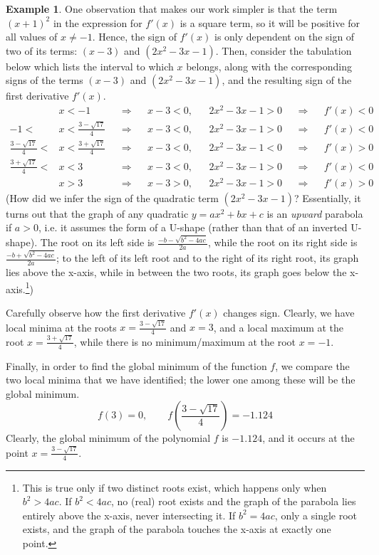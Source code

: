 \documentclass[a4paper]{article}
\theoremstyle{definition}
\newtheorem{example}{Example}[section]
\begin{document}
\begin{example}
	One observation that makes our work simpler is that the term $(x + 1)^2$ in the expression for $f'(x)$ is a square term, so it will be positive for all values of $x \neq -1$.
	Hence, the sign of $f'(x)$ is only dependent on the sign of two of its terms: $(x - 3)$ and $(2x^2 - 3x - 1)$.
	Then, consider the tabulation below which lists the interval to which $x$ belongs, along with the corresponding signs of the terms $(x - 3)$ and $(2x^2 - 3x - 1)$, and the resulting sign of the first derivative $f'(x)$.
	\begin{align*}
		& x < -1 && \Rightarrow && x - 3 < 0, && 2x^2 - 3x - 1 > 0 && \Rightarrow && f'(x) < 0 \\
		-1 < & x < \frac{3 - \sqrt{17}}{4} && \Rightarrow && x - 3 < 0, && 2x^2 - 3x - 1 > 0 && \Rightarrow && f'(x) < 0 \\
		\frac{3 - \sqrt{17}}{4} < & x < \frac{3 + \sqrt{17}}{4} && \Rightarrow && x - 3 < 0, && 2x^2 - 3x - 1 < 0 && \Rightarrow && f'(x) > 0 \\
		\frac{3 + \sqrt{17}}{4} < & x < 3 && \Rightarrow && x - 3 < 0, && 2x^2 - 3x - 1 > 0 && \Rightarrow && f'(x) < 0 \\
		& x > 3 && \Rightarrow && x - 3 > 0, && 2x^2 - 3x - 1 > 0 && \Rightarrow && f'(x) > 0
	\end{align*}
	(How did we infer the sign of the quadratic term $(2x^2 - 3x - 1)$?
	Essentially, it turns out that the graph of any quadratic $y = ax^2 + bx + c$ is an \textit{upward} parabola if $a > 0$, i.e. it assumes the form of a U-shape (rather than that of an inverted U-shape).
	The root on its left side is $\frac{- b - \sqrt{b^2 - 4ac}}{2a}$, while the root on its right side is $\frac{- b + \sqrt{b^2 - 4ac}}{2a}$; to the left of its left root and to the right of its right root, its graph lies above the x-axis, while in between the two roots, its graph goes below the x-axis.\footnote{
		This is true only if two distinct roots exist, which happens only when $b^2 > 4ac$.
		If $b^2 < 4ac$, no (real) root exists and the graph of the parabola lies entirely above the x-axis, never intersecting it.
		If $b^2 = 4ac$, only a single root exists, and the graph of the parabola touches the x-axis at exactly one point.
	})

	Carefully observe how the first derivative $f'(x)$ changes sign.
	Clearly, we have local minima at the roots $x = \frac{3 - \sqrt{17}}{4}$ and $x = 3$, and a local maximum at the root $x = \frac{3 + \sqrt{17}}{4}$, while there is no minimum/maximum at the root $x = -1$.

	Finally, in order to find the global minimum of the function $f$, we compare the two local minima that we have identified; the lower one among these will be the global minimum.
	\begin{equation*}
		f(3) = 0, \qquad f \left( \frac{3 - \sqrt{17}}{4} \right) = -1.124
	\end{equation*}
	Clearly, the global minimum of the polynomial $f$ is $-1.124$, and it occurs at the point $x = \frac{3 - \sqrt{17}}{4}$.
\end{example}
\end{document}
